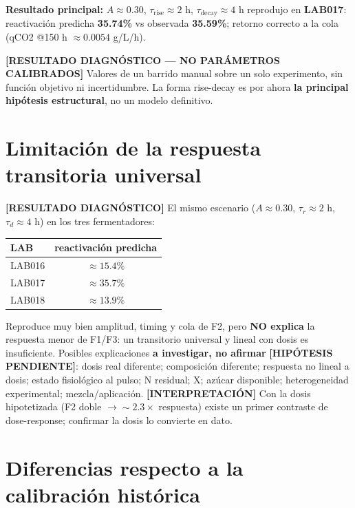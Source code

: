 \documentclass[11pt,a4paper]{article}
\newcommand{\diag}{\textcolor{diagc}{\textbf{[RESULTADO DIAGN\'OSTICO]}}}
\newcommand{\interp}{\textcolor{interp}{\textbf{[INTERPRETACI\'ON]}}}
\newcommand{\hipo}{\textcolor{hipo}{\textbf{[HIP\'OTESIS PENDIENTE]}}}
\begin{document}
\textbf{Resultado principal:} $A \approx 0.30$, $\tau_{\mathrm{rise}} \approx 2$ h, $\tau_{\mathrm{decay}} \approx 4$ h reprodujo en \textbf{LAB017}: reactivaci\'on predicha \textbf{35.74\%} vs observada \textbf{35.59\%}; retorno correcto a la cola (qCO2 @150 h $\approx 0.0054$ g/L/h).

\textbf{\textcolor{diagc}{[RESULTADO DIAGN\'OSTICO --- NO PAR\'AMETROS CALIBRADOS]}} Valores de un barrido manual sobre un solo experimento, sin funci\'on objetivo ni incertidumbre. La forma rise-decay es por ahora \textbf{la principal hip\'otesis estructural}, no un modelo definitivo.

\section{Limitaci\'on de la respuesta transitoria universal}

\diag{} El mismo escenario ($A{\approx}0.30$, $\tau_r{\approx}2$ h, $\tau_d{\approx}4$ h) en los tres fermentadores:

\begin{center}
\begin{tabular}{lc}
\toprule
LAB & reactivaci\'on predicha \\
\midrule
LAB016 & $\approx 15.4\%$ \\
LAB017 & $\approx 35.7\%$ \\
LAB018 & $\approx 13.9\%$ \\
\bottomrule
\end{tabular}
\end{center}

Reproduce muy bien amplitud, timing y cola de F2, pero \textbf{NO explica} la respuesta menor de F1/F3: un transitorio universal y lineal con dosis es insuficiente. Posibles explicaciones \textbf{a investigar, no afirmar} \hipo{}: dosis real diferente; composici\'on diferente; respuesta no lineal a dosis; estado fisiol\'ogico al pulso; N residual; X; az\'ucar disponible; heterogeneidad experimental; mezcla/aplicaci\'on. \interp{} Con la dosis hipotetizada (F2 doble $\to {\sim}2.3\times$ respuesta) existe un primer contraste de dose-response; confirmar la dosis lo convierte en dato.

\section{Diferencias respecto a la calibraci\'on hist\'orica}
\end{document}
